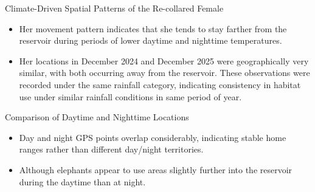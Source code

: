\documentclass{beamer}
\begin{document}
		
		\begin{frame}{Climate-Driven Spatial Patterns of the Re-collared Female}
			\begin{itemize}
				\item Her movement pattern indicates that she tends to stay farther from the reservoir during periods of lower daytime and nighttime temperatures.
				
				\vspace{0.5cm}
				
				\item Her locations in December 2024 and December 2025 were geographically very similar, with both occurring away from the reservoir. These observations were recorded under the same rainfall category, indicating consistency in habitat use under similar rainfall conditions in same period of year.
			\end{itemize}
		\end{frame}
		
		\begin{frame}{Comparison of Daytime and Nighttime Locations}
			\Large
			\begin{itemize}
				\item Day and night GPS points overlap considerably, indicating stable
				home ranges rather than different day/night territories.
				
				\vspace{0.5cm}
				
				\item Although elephants appear to use areas slightly further into the reservoir during the daytime than at night.
			\end{itemize}
			
		\end{frame}
			
\end{document}
